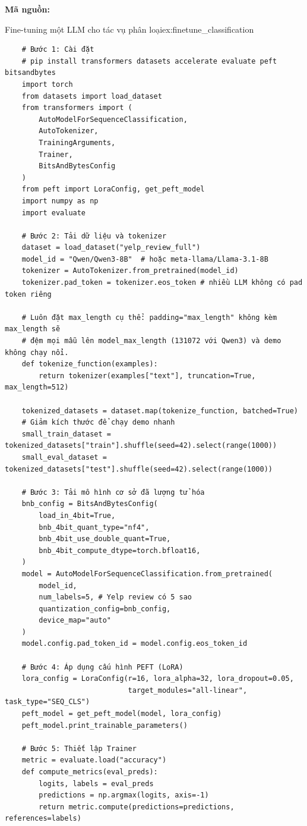 \textbf{Mã nguồn:}

\begin{example}{Fine-tuning một LLM cho tác vụ phân loại}{ex:finetune_classification}
    \begin{verbatim}
    # Bước 1: Cài đặt
    # pip install transformers datasets accelerate evaluate peft bitsandbytes
    import torch
    from datasets import load_dataset
    from transformers import (
        AutoModelForSequenceClassification,
        AutoTokenizer,
        TrainingArguments,
        Trainer,
        BitsAndBytesConfig
    )
    from peft import LoraConfig, get_peft_model
    import numpy as np
    import evaluate
    
    # Bước 2: Tải dữ liệu và tokenizer
    dataset = load_dataset("yelp_review_full")
    model_id = "Qwen/Qwen3-8B"  # hoặc meta-llama/Llama-3.1-8B
    tokenizer = AutoTokenizer.from_pretrained(model_id)
    tokenizer.pad_token = tokenizer.eos_token # nhiều LLM không có pad token riêng
    
    # Luôn đặt max_length cụ thể: padding="max_length" không kèm max_length sẽ
    # đệm mọi mẫu lên model_max_length (131072 với Qwen3) và demo không chạy nổi.
    def tokenize_function(examples):
        return tokenizer(examples["text"], truncation=True, max_length=512)
    
    tokenized_datasets = dataset.map(tokenize_function, batched=True)
    # Giảm kích thước để chạy demo nhanh
    small_train_dataset = tokenized_datasets["train"].shuffle(seed=42).select(range(1000))
    small_eval_dataset = tokenized_datasets["test"].shuffle(seed=42).select(range(1000))
    
    # Bước 3: Tải mô hình cơ sở đã lượng tử hóa
    bnb_config = BitsAndBytesConfig(
        load_in_4bit=True,
        bnb_4bit_quant_type="nf4",
        bnb_4bit_use_double_quant=True,
        bnb_4bit_compute_dtype=torch.bfloat16,
    )
    model = AutoModelForSequenceClassification.from_pretrained(
        model_id,
        num_labels=5, # Yelp review có 5 sao
        quantization_config=bnb_config,
        device_map="auto"
    )
    model.config.pad_token_id = model.config.eos_token_id
    
    # Bước 4: Áp dụng cấu hình PEFT (LoRA)
    lora_config = LoraConfig(r=16, lora_alpha=32, lora_dropout=0.05,
                             target_modules="all-linear", task_type="SEQ_CLS")
    peft_model = get_peft_model(model, lora_config)
    peft_model.print_trainable_parameters()
    
    # Bước 5: Thiết lập Trainer
    metric = evaluate.load("accuracy")
    def compute_metrics(eval_preds):
        logits, labels = eval_preds
        predictions = np.argmax(logits, axis=-1)
        return metric.compute(predictions=predictions, references=labels)
    

\end{verbatim}
\end{example}

